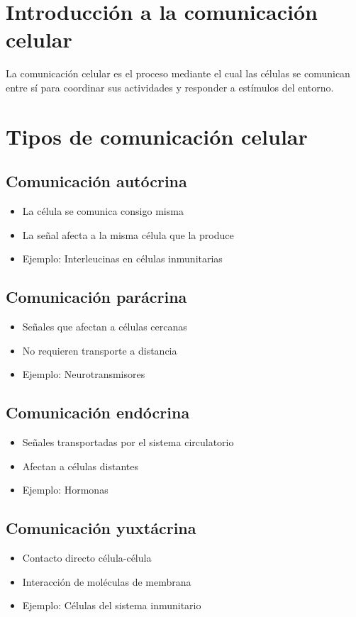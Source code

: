 \section{Introducción a la comunicación celular}

La comunicación celular es el proceso mediante el cual las células se comunican entre sí para coordinar sus actividades y responder a estímulos del entorno.

\section{Tipos de comunicación celular}

\subsection{Comunicación autócrina}
\begin{itemize}
    \item La célula se comunica consigo misma
    \item La señal afecta a la misma célula que la produce
    \item Ejemplo: Interleucinas en células inmunitarias
\end{itemize}

\subsection{Comunicación parácrina}
\begin{itemize}
    \item Señales que afectan a células cercanas
    \item No requieren transporte a distancia
    \item Ejemplo: Neurotransmisores
\end{itemize}

\subsection{Comunicación endócrina}
\begin{itemize}
    \item Señales transportadas por el sistema circulatorio
    \item Afectan a células distantes
    \item Ejemplo: Hormonas
\end{itemize}

\subsection{Comunicación yuxtácrina}
\begin{itemize}
    \item Contacto directo célula-célula
    \item Interacción de moléculas de membrana
    \item Ejemplo: Células del sistema inmunitario
\end{itemize}

